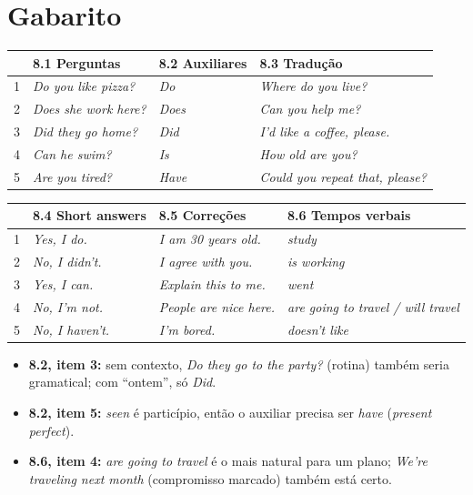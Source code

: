 \documentclass[12pt,a4paper,oneside]{book}
\newcommand{\en}[1]{\textit{#1}}                 %
\begin{document}
\newpage
\section{Gabarito}

\begin{center}
\small
\begin{tabularx}{\textwidth}{@{}lXXX@{}}
\toprule
& \textbf{8.1 Perguntas} & \textbf{8.2 Auxiliares} & \textbf{8.3 Tradução} \\
\midrule
1 & \en{Do you like pizza?} & \en{Do} & \en{Where do you live?} \\
2 & \en{Does she work here?} & \en{Does} & \en{Can you help me?} \\
3 & \en{Did they go home?} & \en{Did} & \en{I'd like a coffee, please.} \\
4 & \en{Can he swim?} & \en{Is} & \en{How old are you?} \\
5 & \en{Are you tired?} & \en{Have} & \en{Could you repeat that, please?} \\
\bottomrule
\end{tabularx}

\vspace{1em}
\begin{tabularx}{\textwidth}{@{}lXXX@{}}
\toprule
& \textbf{8.4 Short answers} & \textbf{8.5 Correções} & \textbf{8.6 Tempos verbais} \\
\midrule
1 & \en{Yes, I do.} & \en{I am 30 years old.} & \en{study} \\
2 & \en{No, I didn't.} & \en{I agree with you.} & \en{is working} \\
3 & \en{Yes, I can.} & \en{Explain this to me.} & \en{went} \\
4 & \en{No, I'm not.} & \en{People are nice here.} & \en{are going to travel / will travel} \\
5 & \en{No, I haven't.} & \en{I'm bored.} & \en{doesn't like} \\
\bottomrule
\end{tabularx}
\end{center}

\begin{nota}
\begin{itemize}
  \item \textbf{8.2, item 3:} sem contexto, \en{Do they go to the party?} (rotina) também seria gramatical; com ``ontem'', só \en{Did}.
  \item \textbf{8.2, item 5:} \en{seen} é particípio, então o auxiliar precisa ser \en{have} (\emph{present perfect}).
  \item \textbf{8.6, item 4:} \en{are going to travel} é o mais natural para um plano; \en{We're traveling next month} (compromisso marcado) também está certo.
\end{itemize}
\end{nota}
\end{document}

